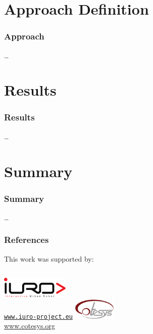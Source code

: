 \documentclass[noshadow, aspectratio=169]{LSRslides}
\begin{document}
\section[Approach]{Approach Definition}
\begin{frame}
	\frametitle{Approach}
	\dots
\end{frame}

\section{Results}

\begin{frame}
	\frametitle{Results}
	\dots
\end{frame}

\section{Summary}

\begin{frame}
	\frametitle{Summary}
	\dots
\end{frame}

\appendix
\begin{frame}
	\frametitle{References}
	\printbibliography
	This work was supported by:
	\vspace{0.2cm}
	\begin{columns}[onlytextwidth,T]
		\centering
		\includegraphics[height=1cm]{iuro}\\
		\href{http://www.iuro-project.eu}{\texttt{www.iuro-project.eu}}
		\centering
		\includegraphics[height=1cm]{cotesys}\\
		\url{www.cotesys.org}
	\end{columns}
\end{frame}
\end{document}
